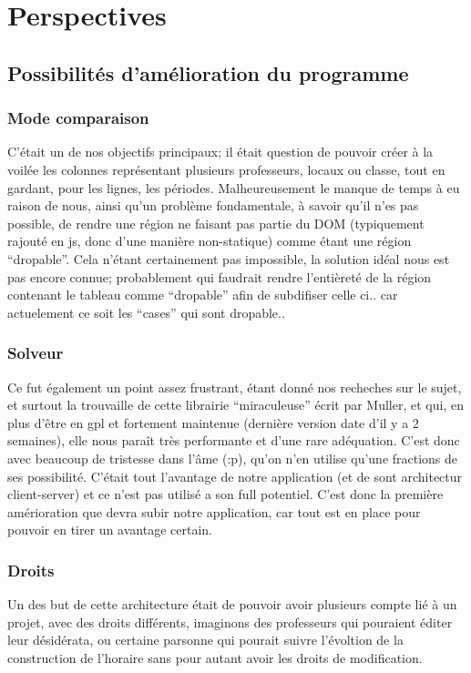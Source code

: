 \chapter{Perspectives}

\section{Possibilités d'amélioration du programme}

\subsection{Mode comparaison}
C'était un de nos objectifs principaux; il était question de pouvoir créer à la
voilée les colonnes représentant plusieurs professeurs, locaux ou classe, tout
en gardant, pour les lignes, les périodes. Malheureusement le manque de temps à
eu raison de nous, ainsi qu'un problème fondamentale, à savoir qu'il n'es pas
possible, de rendre une région ne faisant pas partie du DOM (typiquement rajouté
en js, donc d'une manière non-statique) comme étant une région ``dropable''.
Cela n'étant certainement pas impossible, la solution idéal nous est pas encore
connue; probablement qui faudrait rendre l'entièreté de la région contenant le
tableau comme ``dropable'' afin de subdifiser celle ci.. car actuelement ce soit
les ``cases'' qui sont dropable..

\subsection{Solveur}
Ce fut également un point assez frustrant, étant donné nos recheches 
sur le sujet, et surtout la trouvaille de cette librairie ``miraculeuse'' écrit
par Muller, et qui, en plus d'être en gpl et fortement maintenue (dernière
version date d'il y a 2 semaines), elle nous paraît très performante et d'une
rare adéquation.  C'est donc avec beaucoup de tristesse dans l’âme (:p), qu'on n'en
utilise qu'une fractions de ses possibilité.  C'était tout l'avantage de notre
application (et de sont architectur client-server) et ce n'est pas utilisé a son
full potentiel.  C'est donc la première amérioration que devra subir notre
application, car tout est en place pour pouvoir en tirer un avantage certain.

\subsection{Droits}
Un des but de cette architecture était de pouvoir avoir plusieurs compte lié à
un projet, avec des droits différents, imaginons des professeurs qui pouraient
éditer leur désidérata, ou certaine parsonne qui pourait suivre l'évoltion de la
construction de l'horaire sans pour autant avoir les droits de modification.

